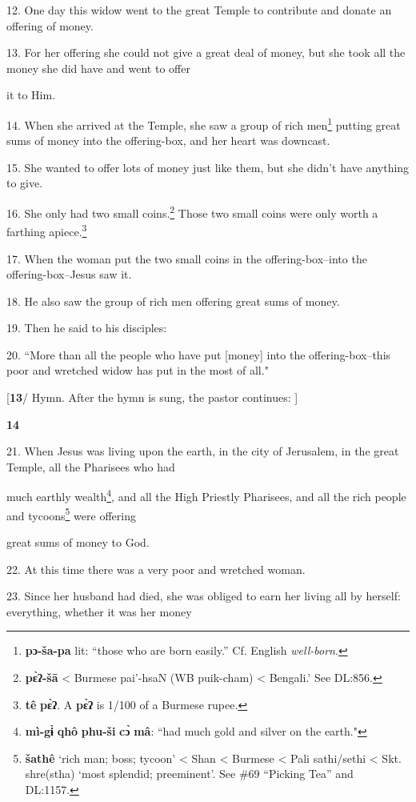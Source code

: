 12. One day this widow went to the great Temple to contribute and donate an offering
of money.

13. For her offering she could not give a great deal of money, but she took all
the money she did have and went to offer

it to Him.

14. When she arrived at the Temple, she saw a group of rich men\footnote{\textbf{pɔ-ša-pa} lit: ``those who are born easily.'' Cf. English \textit{well-born}.} putting great
sums of money into the offering-box, and her heart was downcast.

15. She wanted to offer lots of money just like them, but she didn't have anything
to give.

16. She only had two small coins.\footnote{\textbf{pɛ̀ʔ-šā} < Burmese pai'-hsaN (WB puik-cham) < Bengali.' See DL:856.} Those two small coins were only worth a farthing
apiece.\footnote{\textbf{tê} \textbf{pɛ̀ʔ}. A \textbf{pɛ̀ʔ} is 1/100 of a Burmese rupee.}

17. When the woman put the two small coins in the offering-box--into the offering-box--Jesus
saw it.

18. He also saw the group of rich men offering great sums of money.

19. Then he said to his disciples:

20. ``More than all the people who have put [money] into the offering-box--this
poor and wretched widow has put in the most of all."

[\textbf{13}/ Hymn. After the hymn is sung, the pastor continues: ]

\textbf{14 }

21. When Jesus was living upon the earth, in the city of Jerusalem, in the great
Temple, all the Pharisees who had

much earthly wealth\footnote{\textbf{mì-gɨ̀} \textbf{qhô} \textbf{phu-ši} \textbf{cɔ̀} \textbf{mâ}: ``had much gold and silver on the earth."}, and all the High Priestly Pharisees, and all the rich
people and tycoons\footnote{\textbf{šathê} `rich man; boss; tycoon' < Shan < Burmese < Pali sathi/sethi < Skt. shre(stha) `most splendid; preeminent'. See \#69 ``Picking Tea'' and DL:1157.} were offering

great sums of money to God.

22. At this time there was a very poor and wretched woman.

23. Since her husband had died, she was obliged to earn her living all by herself:
everything, whether it was her money

